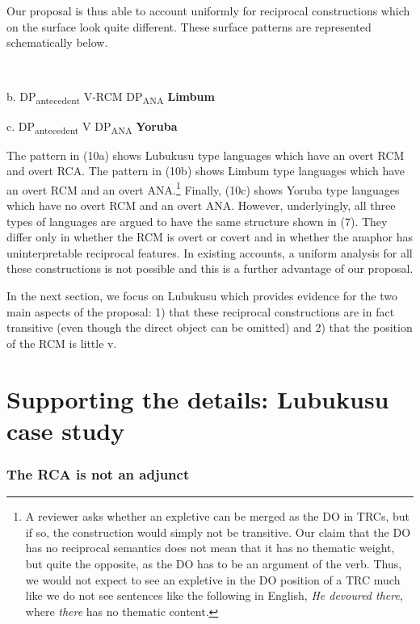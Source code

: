 \documentclass[output=paper]{langsci/langscibook}
\begin{document}
  Our proposal is thus able to account uniformly for reciprocal constructions which on the surface look quite different. These surface patterns are represented schematically below.

\begin{listWWviiiNumxlileveli}
\item \ea\label{ex:}
\\
\end{listWWviiiNumxlileveli}

  b.  DP\-\textsubscript{antecedent}      V-RCM  DP\textsubscript{ANA    }\textbf{Limbum}

  c.  DP\-\textsubscript{antecedent}      V    DP\textsubscript{ANA}    \textbf{Yoruba}  

The pattern in (10a) shows Lubukusu type languages which have an overt RCM and overt RCA. The pattern in (10b) shows Limbum type languages which have an overt RCM and an overt ANA.\footnote{ A reviewer asks whether an expletive can be merged as the DO in TRCs, but if so, the construction would simply not be transitive. Our claim that the DO has no reciprocal semantics does not mean that it has no thematic weight, but quite the opposite, as the DO has to be an argument of the verb. Thus, we would not expect to see an expletive in the DO position of a TRC much like we do not see sentences like the following in English, \textit{He devoured there}, where \textit{there }has\textit{ }no thematic content.  } Finally, (10c) shows Yoruba type languages which have no overt RCM and an overt ANA. However, underlyingly, all three types of languages are argued to have the same structure shown in (7). They differ only in whether the RCM is overt or covert and in whether the anaphor has uninterpretable reciprocal features.  In existing accounts, a uniform analysis for all these constructions is not possible and this is a further advantage of our proposal. 

  In the next section, we focus on Lubukusu which provides evidence for the two main aspects of the proposal: 1) that these reciprocal constructions are in fact transitive (even though the direct object can be omitted) and 2) that the position of the RCM is little v.

\chapter{Supporting the details: Lubukusu case study}
\subsection{ The RCA is not an adjunct}
\end{document}
